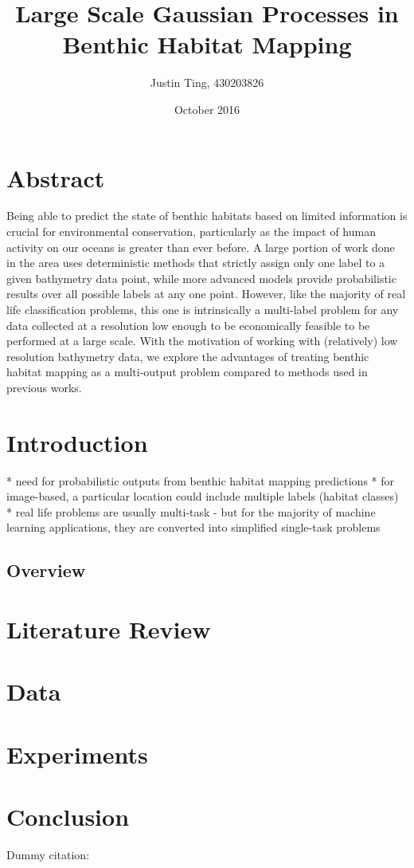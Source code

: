 \documentclass[10pt,sts]{article}
\title{Large Scale Gaussian Processes in Benthic Habitat Mapping}
\author{Justin Ting, 430203826}
\date{October 2016}
\begin{document}
\maketitle

    \section{Abstract}
    Being able to predict the state of benthic habitats based on limited information is crucial for environmental conservation, particularly as the impact of human activity on our oceans is greater than ever before. A large portion of work done in the area uses deterministic methods that strictly assign only one label to a given bathymetry data point, while more advanced models provide probabilistic results over all possible labels at any one point. However, like the majority of real life classification problems, this one is intrinsically a multi-label problem for any data collected at a resolution low enough to be economically feasible to be performed at a large scale. With the motivation of working with (relatively) low resolution bathymetry data, we explore the advantages of treating benthic habitat mapping as a multi-output problem compared to methods used in previous works.

    \section{Introduction}
    * need for probabilistic outputs from benthic habitat mapping predictions
    * for image-based, a particular location could include multiple labels (habitat classes)
    * real life problems are usually multi-task - but for the majority of machine learning applications, they are converted into simplified single-task problems

    \subsection{Overview}

    \section{Literature Review}

    \section{Data}

    \section{Experiments}

    \section{Conclusion}
    Dummy citation: ~\citep{halpern08}




\end{document}
